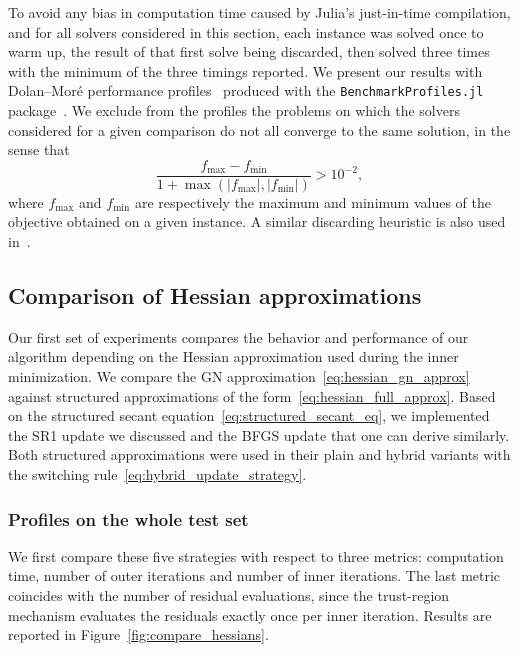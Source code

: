 \documentclass{article}
\numberwithin{equation}{section}
\theoremstyle{plain}
\begin{document}
	To avoid any bias in computation time caused by Julia's just-in-time compilation, and for all solvers considered in this section, each instance was solved once to warm up, the result of that first solve being discarded, then solved three times with the minimum of the three timings reported. We present our results with Dolan--Mor\'e performance profiles~\cite{dolanmore:2002} produced with the \texttt{BenchmarkProfiles.jl} package~\cite{benchmark-profiles-julia}. We exclude from the profiles the problems on which the solvers considered for a given comparison do not all converge to the same solution, in the sense that
	\begin{equation}\label{eq:discarding_heuristic}
	\dfrac{f_{\max} - f_{\min}}{1 + \max \left(|f_{\max}|,|f_{\min}|\right)} > 10^{-2},
	\end{equation}
	where $f_{\max}$ and $f_{\min}$ are respectively the maximum and minimum values of the objective obtained on a given instance. A similar discarding heuristic is also used in~\cite{wachterbiegler:2006, orbansiqueira:2020}.

	\subsection{Comparison of Hessian approximations}\label{subsec:compare_hessians}

	Our first set of experiments compares the behavior and performance of our algorithm depending on the Hessian approximation used during the inner minimization. We compare the GN approximation~\eqref{eq:hessian_gn_approx} against structured approximations of the form~\eqref{eq:hessian_full_approx}. Based on the structured secant equation~\eqref{eq:structured_secant_eq}, we implemented the SR1 update we discussed and the BFGS update that one can derive similarly. Both structured approximations were used in their plain and hybrid variants with the switching rule~\eqref{eq:hybrid_update_strategy}.

	\subsubsection{Profiles on the whole test set}

	We first compare these five strategies with respect to three metrics: computation time, number of outer iterations and number of inner iterations. The last metric coincides with the number of residual evaluations, since the trust-region mechanism evaluates the residuals exactly once per inner iteration. Results are reported in Figure~\ref{fig:compare_hessians}.
\end{document}
